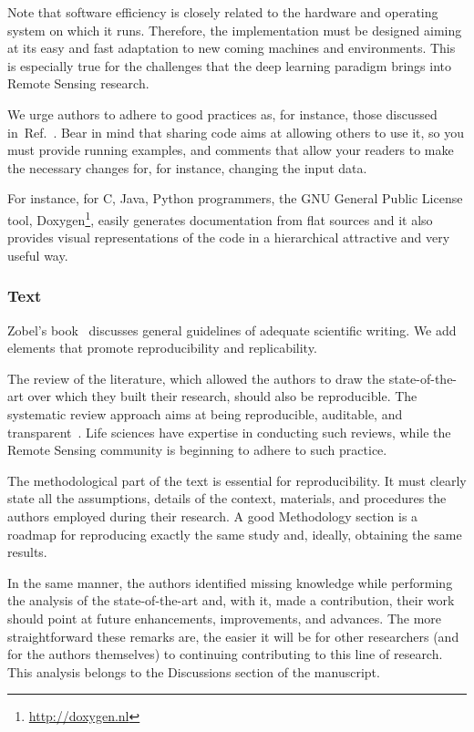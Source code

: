 \documentclass[journal,twoside]{IEEEtran}
\begin{document}
Note that software efficiency is closely related to the hardware and operating system on which it runs.
Therefore, the implementation must be designed aiming at its easy and fast adaptation to new coming machines and environments. 
This is especially true for the challenges that the deep learning paradigm brings into Remote Sensing research.

We urge authors to adhere to good practices as, for instance, those discussed in~Ref.~\cite[Chapter 7]{WritingScientificSoftware}.
Bear in mind that sharing code aims at allowing others to use it, so you must provide running examples, and comments that allow your readers to make the necessary changes for, for instance, changing the input data.

For instance, for C, Java, Python programmers, the  GNU General Public License tool, Doxygen\footnote{\url{http://doxygen.nl}}, easily generates documentation from flat sources and it also provides visual representations of the code in a hierarchical attractive and very useful way.

\subsubsection{Text}

Zobel's book~\cite{WritingforComputerScience} discusses general guidelines of adequate scientific writing.
We add elements that promote reproducibility and replicability.

The review of the literature, which allowed the authors to draw the state-of-the-art over which they built their research, should also be reproducible.
The systematic review approach aims at being reproducible, auditable, and transparent~\cite{TowardsaMethodologyforDevelopingEvidenceInformedManagementKnowledgebyMeansofSystematicReview}.
Life sciences have expertise in conducting such reviews, while the Remote Sensing community is beginning to adhere to such practice.

The methodological part of the text is essential for reproducibility.
It must clearly state all the assumptions, details of the context, materials, and procedures the authors employed during their research.
A good Methodology section is a roadmap for reproducing exactly the same study and, ideally, obtaining the same results.

In the same manner, the authors identified missing knowledge while performing the analysis of the state-of-the-art and, with it, made a contribution, their work should point at future enhancements, improvements, and advances.
The more straightforward these remarks are, the easier it will be for other researchers (and for the authors themselves) to continuing contributing to this line of research.
This analysis belongs to the Discussions section of the manuscript.
\end{document}
